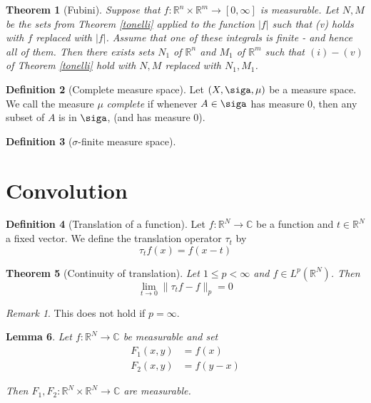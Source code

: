 \documentclass[10pt, oneside, reqno]{amsart}
\theoremstyle{plain}%
\newtheorem{thm}{Theorem}[section]
\newtheorem{lem}[thm]{Lemma}
\theoremstyle{definition}
\newtheorem{defn}[thm]{Definition}
\theoremstyle{remark}
\newtheorem*{rem}{Remark}
\newcommand{\R}{\mathbb{R}}
\newcommand{\Com}{\mathbb{C}}
\begin{document}
\begin{thm}[Fubini]
    Suppose that $f: \R^n \times \R^m \rightarrow [0,\infty]$ is measurable. Let $N,M$ be the sets from Theorem \ref{tonelli} applied to the function $|f| $ such that (v) holds with $f$ replaced with $|f|$.  Assume that one of these integrals is finite - and hence all of them.  Then there exists sets $N_1$ of $\R^n$ and $M_1$ of $\R^m$ such that $(i) - (v)$ of Theorem \ref{tonelli} hold with $N,M$ replaced with $N_1, M_1$.
\end{thm}


\begin{defn}[Complete measure space]
    Let $(X,\siga, \mu)$ be a measure space.  We call the measure $\mu$ \emph{complete} if whenever $A \in \siga$ has measure $0$, then any subset of $A$ is in $\siga$, (and has measure 0).
\end{defn}
\begin{defn}[$\sigma$-finite measure space]
    
\end{defn}









\section{Convolution} %
\label{sec:convolution}


\begin{defn}[Translation of a function]
    Let $f: \R^N \rightarrow \Com$ be a function and $t \in \R^N$ a fixed vector. We define the translation operator $\tau_t$ by \[
        \tau_t f(x) = f(x-t)
    \]
\end{defn}

\begin{thm}[Continuity of translation]
    Let $1 \leq p < \infty$ and $f \in L^p(\R^N)$.  Then \[
        \lim_{t \rightarrow 0} \| \tau_t f - f \|_p = 0
    \]
\end{thm}
\begin{rem}
    This does not hold if $p = \infty$.
\end{rem}

\begin{lem}
    Let $f : \R^N \rightarrow \Com$ be measurable and set 
    \begin{align*}
        F_1(x,y) &= f(x) \\
        F_2(x,y) &= f(y-x)
    \end{align*}
    
    Then $F_1, F_2 : \R^N \times \R^N \rightarrow \Com$ are measurable.
\end{lem}
\end{document}
